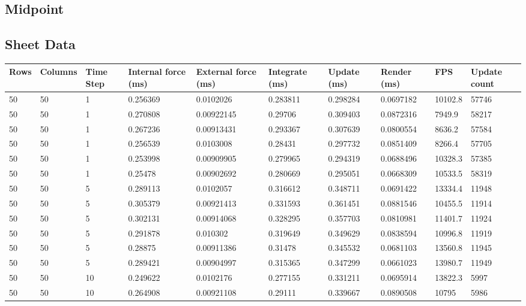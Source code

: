 \begin{landscape}
\section{Midpoint}

\subsection{Sheet Data}

\begin{longtable}{ | l | l | l | l | l | l | l | l | l | l | }
\hline
 Rows &  Columns &  Time Step &  Internal force (ms) &  External force (ms) &  Integrate (ms) &  Update (ms) &  Render (ms) &  FPS &  Update count \\ \hline
50 & 50 & 1 & 0.256369 & 0.0102026 & 0.283811 & 0.298284 & 0.0697182 & 10102.8 & 57746\\ \hline
50 & 50 & 1 & 0.270808 & 0.00922145 & 0.29706 & 0.309403 & 0.0872316 & 7949.9 & 58217\\ \hline
50 & 50 & 1 & 0.267236 & 0.00913431 & 0.293367 & 0.307639 & 0.0800554 & 8636.2 & 57584\\ \hline
50 & 50 & 1 & 0.256539 & 0.0103008 & 0.28431 & 0.297732 & 0.0851409 & 8266.4 & 57705\\ \hline
50 & 50 & 1 & 0.253998 & 0.00909905 & 0.279965 & 0.294319 & 0.0688496 & 10328.3 & 57385\\ \hline
50 & 50 & 1 & 0.25478 & 0.00902692 & 0.280669 & 0.295051 & 0.0668309 & 10533.5 & 58319\\ \hline
50 & 50 & 5 & 0.289113 & 0.0102057 & 0.316612 & 0.348711 & 0.0691422 & 13334.4 & 11948\\ \hline
50 & 50 & 5 & 0.305379 & 0.00921413 & 0.331593 & 0.361451 & 0.0881546 & 10455.5 & 11914\\ \hline
50 & 50 & 5 & 0.302131 & 0.00914068 & 0.328295 & 0.357703 & 0.0810981 & 11401.7 & 11924\\ \hline
50 & 50 & 5 & 0.291878 & 0.010302 & 0.319649 & 0.349629 & 0.0838594 & 10996.8 & 11919\\ \hline
50 & 50 & 5 & 0.28875 & 0.00911386 & 0.31478 & 0.345532 & 0.0681103 & 13560.8 & 11945\\ \hline
50 & 50 & 5 & 0.289421 & 0.00904997 & 0.315365 & 0.347299 & 0.0661023 & 13980.7 & 11949\\ \hline
50 & 50 & 10 & 0.249622 & 0.0102176 & 0.277155 & 0.331211 & 0.0695914 & 13822.3 & 5997\\ \hline
50 & 50 & 10 & 0.264908 & 0.00921108 & 0.29111 & 0.339667 & 0.0890508 & 10795 & 5986\\ \hline

\end{longtable}
\end{landscape}
